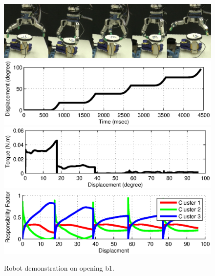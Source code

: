 \begin{figure}
  \centering
  \includegraphics[width=15cm]{./fig_cha4/demo_b1.jpg}
  \includegraphics[width=15cm]{./fig_cha4/demo_b1_s.eps}
  \includegraphics[width=15cm]{./fig_cha4/demo_b1_T.eps}
  \includegraphics[width=15cm]{./fig_cha4/demo_b1_rf.eps}
  \caption{ \scriptsize{Robot demonstration on opening b1.}
}
\label{fig:demo_b1}
\end{figure}

